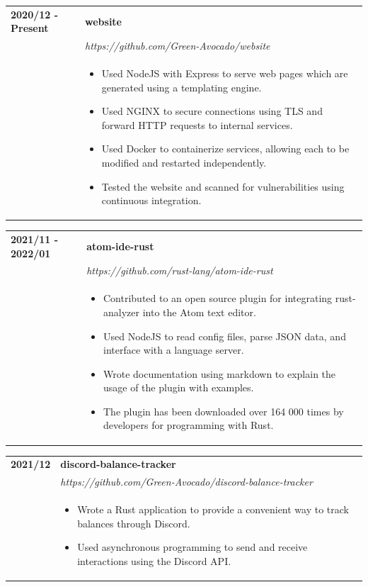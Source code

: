 \documentclass[letterpaper]{article}
\begin{document}
        \begin{tabular}{p{} p{}}
            \textbf{2020/12 - Present} & \textbf{website} \\
            & \emph{https://github.com/Green-Avocado/website} \\
            & \begin{itemize}
                \item Used NodeJS with Express to serve web pages which are generated using a templating
                    engine.
                \item Used NGINX to secure connections using TLS and forward HTTP requests to internal
                    services.
                \item Used Docker to containerize services, allowing each to be modified and restarted
                    independently.
                \item Tested the website and scanned for vulnerabilities using continuous integration.
            \end{itemize}
        \end{tabular}

        \begin{tabular}{p{} p{}}
            \textbf{2021/11 - 2022/01} & \textbf{atom-ide-rust} \\
            & \emph{https://github.com/rust-lang/atom-ide-rust} \\
            & \begin{itemize}
                \item Contributed to an open source plugin for integrating rust-analyzer into the Atom
                    text editor.
                \item Used NodeJS to read config files, parse JSON data, and interface with a language
                    server.
                \item Wrote documentation using markdown to explain the usage of the plugin with examples.
                \item The plugin has been downloaded over 164 000 times by developers for programming with
                    Rust.
            \end{itemize}
        \end{tabular}

        \begin{tabular}{p{} p{}}
            \textbf{2021/12} & \textbf{discord-balance-tracker} \\
            & \emph{https://github.com/Green-Avocado/discord-balance-tracker} \\
            & \begin{itemize}
                \item Wrote a Rust application to provide a convenient way to track balances through
                    Discord.
                \item Used asynchronous programming to send and receive interactions using the Discord
                    API.
            \end{itemize}
        \end{tabular}
\end{document}
